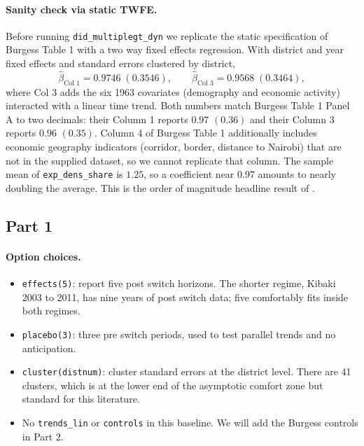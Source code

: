 \paragraph{Sanity check via static TWFE.} Before running \texttt{did\_multiplegt\_dyn} we replicate the static specification of Burgess Table 1 with a two way fixed effects regression. With district and year fixed effects and standard errors clustered by district,
\[
\widehat\beta_{\text{Col 1}} = 0.9746 \; (0.3546), \qquad \widehat\beta_{\text{Col 3}} = 0.9568 \; (0.3464),
\]
where Col 3 adds the six 1963 covariates (demography and economic activity) interacted with a linear time trend. Both numbers match Burgess Table 1 Panel A to two decimals: their Column 1 reports $0.97$ $(0.36)$ and their Column 3 reports $0.96$ $(0.35)$. Column 4 of Burgess Table 1 additionally includes economic geography indicators (corridor, border, distance to Nairobi) that are not in the supplied dataset, so we cannot replicate that column. The sample mean of \texttt{exp\_dens\_share} is $1.25$, so a coefficient near $0.97$ amounts to nearly doubling the average. This is the order of magnitude headline result of \citet{burgess2015}.

\subsection*{Part 1}

\paragraph{Option choices.}
\begin{itemize}\setlength\itemsep{0pt}
  \item \texttt{effects(5)}: report five post switch horizons. The shorter regime, Kibaki 2003 to 2011, has nine years of post switch data; five comfortably fits inside both regimes.
  \item \texttt{placebo(3)}: three pre switch periods, used to test parallel trends and no anticipation.
  \item \texttt{cluster(distnum)}: cluster standard errors at the district level. There are 41 clusters, which is at the lower end of the asymptotic comfort zone but standard for this literature.
  \item No \texttt{trends\_lin} or \texttt{controls} in this baseline. We will add the Burgess controls in Part 2.
\end{itemize}

